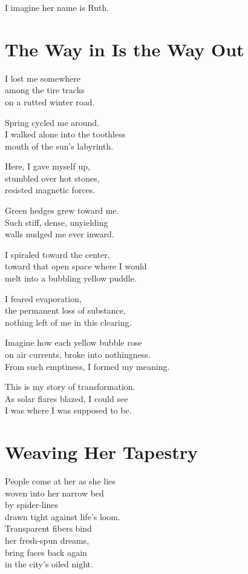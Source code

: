 \documentclass[twoside,10pt]{book}
\begin{document}
I imagine her name is Ruth.


\clearpage
\section{The Way in Is the Way Out}

I lost me somewhere\\
among the tire tracks\\
on a rutted winter road.

Spring cycled me around.\\
I walked alone into the toothless\\
mouth of the sun's labyrinth.

Here, I gave myself up,\\
stumbled over hot stones,\\
resisted magnetic forces.

Green hedges grew toward me.\\
Such stiff, dense, unyielding\\
walls nudged me ever inward.

I spiraled toward the center,\\
toward that open space where I would\\
melt into a bubbling yellow puddle.

I feared evaporation,\\
the permanent loss of substance,\\
nothing left of me in this clearing.

Imagine how each yellow bubble rose\\
on air currents, broke into nothingness.\\
From such emptiness, I formed my meaning.

This is my story of transformation.\\
As solar flares blazed, I could see\\
I was where I was supposed to be.


\clearpage
\section{Weaving Her Tapestry}

People come at her as she lies\\
woven into her narrow bed\\
by spider-lines\\
drawn tight against life's loom.\\
Transparent fibers bind\\
her fresh-spun dreams,\\
bring faces back again\\
in the city's oiled night.
\end{document}
